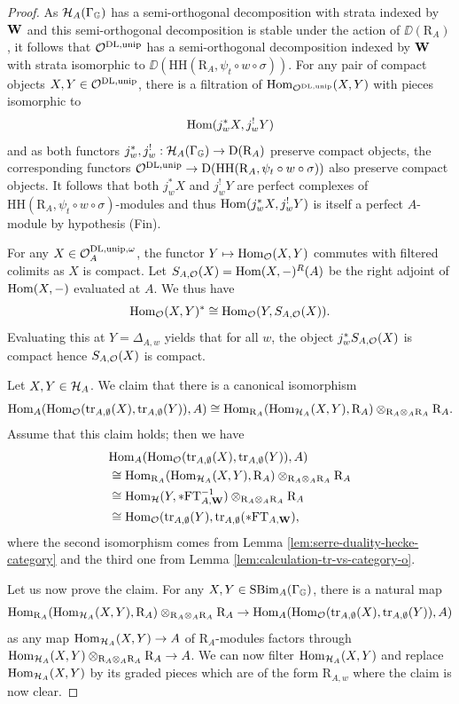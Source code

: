 \documentclass[a4paper, 10pt, oneside, reqno]{amsart}
\theoremstyle{plain}
\theoremstyle{definition}
\theoremstyle{remark}
\newcommand{\Gbb}{\mathbb{G}}
\newcommand{\RR}{\mathrm{R}}
\newcommand{\HHH}{\mathrm{HH}}
\newcommand{\FT}{\mathrm{FT}}
\begin{document}
\begin{proof}
As $\Hcal_{A}(\Gamma_{\Gbb})$ has a semi-orthogonal decomposition with strata indexed by $\mathbf{W}$ and this semi-orthogonal decomposition is stable under the action of $\DD(\RR_A)$, it follows that $\mathcal{O}^{\mathrm{DL}, \mathrm{unip}}$ has a semi-orthogonal decomposition indexed by $\mathbf{W}$ with strata isomorphic to $\DD(\HHH(\RR_A, \psi_t \circ w \circ \sigma))$. For any pair of compact objects $X,Y \in \mathcal{O}^{\mathrm{DL}, \mathrm{unip}}$, there is a filtration of $\mathrm{Hom}_{\mathcal{O}^{\mathrm{DL}, \mathrm{unip}}}(X,Y)$ with pieces isomorphic to 
$$\mathrm{Hom}(j_w^*X,j_w^!Y)$$
and as both functors $j_w^*, j_w^! : \Hcal_{A}(\Gamma_{\Gbb}) \to \DD(\RR_A)$ preserve compact objects, the corresponding functors $\Ocal^{\DL, \unip} \to \DD(\HHH(\RR_A, \psi_t \circ w \circ \sigma))$ also preserve compact objects. It follows that both $j_w^*X$ and $j_w^!Y$ are perfect complexes of $\HHH(\RR_A, \psi_t \circ w \circ \sigma)$-modules and thus $\mathrm{Hom}(j_w^*X,j_w^!Y)$ is itself a perfect $A$-module by hypothesis (Fin). 

For any $X \in \mathcal{O}_A^{\mathrm{DL}, \mathrm{unip}, \omega}$, the functor $Y \mapsto \mathrm{Hom}_{\mathcal{O}}(X,Y)$ commutes with filtered colimits as $X$ is compact. Let $S_{A,\mathcal{O}}(X) = \mathrm{Hom}(X,-)^{R}(A)$ be the right adjoint of $\mathrm{Hom}(X,-)$ evaluated at $A$. We thus have 
$$\mathrm{Hom}_{\mathcal{O}}(X,Y)^* \cong \mathrm{Hom}_{\mathcal{O}}(Y, S_{A,\mathcal{O}}(X)).$$
Evaluating this at $Y = \Delta_{A,w}$ yields that for all $w$, the object $j_w^*S_{A,\mathcal{O}}(X)$ is compact hence $S_{A,\mathcal{O}}(X)$ is compact. 

Let $X,Y \in \mathcal{H}_A$. We claim that there is a canonical isomorphism 
$$\Hom_A(\Hom_{\Ocal}(\tr_{A,\emptyset}(X), \tr_{A,\emptyset}(Y)), A) \cong \Hom_{\RR_A}(\Hom_{\Hcal_A}(X,Y), \RR_A) \otimes_{\RR_A \otimes_A \RR_A} \RR_A.$$
Assume that this claim holds; then we have 
\begin{align*}
&\Hom_A(\Hom_{\Ocal}(\tr_{A,\emptyset}(X), \tr_{A,\emptyset}(Y)), A) \\
&\cong \Hom_{\RR_A}(\Hom_{\Hcal_A}(X,Y), \RR_A) \otimes_{\RR_A \otimes_A \RR_A} \RR_A \\
&\cong \Hom_{\Hcal}(Y, * \FT_{A,\Wbf}^{-1}) \otimes_{\RR_A \otimes_A \RR_A} \RR_A \\
&\cong \Hom_{\Ocal}(\tr_{A,\emptyset}(Y), \tr_{A,\emptyset}(* \FT_{A,\Wbf}),
\end{align*}
where the second isomorphism comes from Lemma \ref{lem:serre-duality-hecke-category} and the third one from Lemma \ref{lem:calculation-tr-vs-category-o}. 

Let us now prove the claim. For any $X,Y \in \SBim_A(\Gamma_{\Gbb})$, there is a natural 	map 
$$\Hom_{\RR_A}(\Hom_{\Hcal_A}(X,Y), \RR_A) \otimes_{\RR_A \otimes_A \RR_A} \RR_A \to \Hom_A(\Hom_{\Ocal}(\tr_{A,\emptyset}(X), \tr_{A,\emptyset}(Y)), A)$$
as any map $\mathrm{Hom}_{\mathcal{H}_A}(X,Y) \to A$ of $\RR_A$-modules factors through $\Hom_{\Hcal_A}(X,Y) \otimes_{\RR_A \otimes_A \RR_A} \RR_A \to A$. We can now filter $\mathrm{Hom}_{\mathcal{H}_A}(X,Y)$ and replace $\mathrm{Hom}_{\mathcal{H}_A}(X,Y)$ by its graded pieces which are of the form $\RR_{A,w}$ where the claim is now clear. 
\end{proof}
\end{document}
